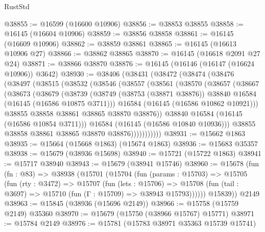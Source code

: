 \begin{lexlean}{RustStd}
\begin{coremodule}
@38855 := @16599 (@16600 @10906)
@38856 := @38853 @38855
@38858 := @16145 (@16604 @10906)
@38859 := @38856 @38858
@38861 := @16145 (@16609 @10906)
@38862 := @38859 @38861
@38865 := @16145 (@16613 @10906 @27)
@38866 := @38862 @38865
@38870 := @16145 (@16618 @2091 @27 @24)
@38871 := @38866 @38870
@38876 := @16145 (@16146 (@16147 (@16624 @10906)) @3642)
@38930 := @38406
    (@38431
      (@38472
        (@38474
          (@38476
            (@38497
              (@38515
                (@38532
                  (@38546
                    (@38557
                      (@38561
                        (@38570
                          (@38657
                            (@38667
                              (@38673
                                (@38679
                                  (@38739
                                    (@38749
                                      (@38753 (@38871 @38876))
                                      @38840
                                      @16584
                                      (@16145 (@16586 @10875 @3711)))
                                    @16584
                                    (@16145 (@16586 @10862 @10921)))
                                  @38855
                                  @38858
                                  @38861
                                  @38865
                                  @38870
                                  @38876))
                              @38840
                              @16584
                              (@16145 (@16586 @10854 @3711)))
                            @16584
                            (@16145 (@16586 @10840 @10936)))
                          @38855
                          @38858
                          @38861
                          @38865
                          @38870
                          @38876)))))))))))
@38931 := @15662 @1863
@38935 := @15664 (@15668 @1863) (@15674 @1863)
@38936 := @15683 @35357
@38938 := @15679 (@38936 @15698)
@38940 := @15721 (@15722 @1863)
@38941 := @15717 @38940
@38943 := @15679 (@38941 @15746)
@38960 := @15678
    (fun (fn : @83) =>
    @38938
      (@15701
        (@15704
          (fun (params : @15703) =>
          @15705
            (fun (rty : @3472) =>
            @15707
              (fun (lets : @15706) =>
              @15708 (fun (tail : @3697) => @15710 (fun (Γ : @15709) => @38943 @15793))))))
        @15839))
    @2149
@38963 := @15845 (@38936 (@15696 @2149))
@38966 := @15758 (@15759 @2149) @35360
@38970 := @15679 (@15750 (@38966 @15767) @15771)
@38971 := @15784 @2149
@38976 := @15781 (@15783 @38971 @35363 @15739 @15741)

\end{coremodule}
\end{lexlean}
